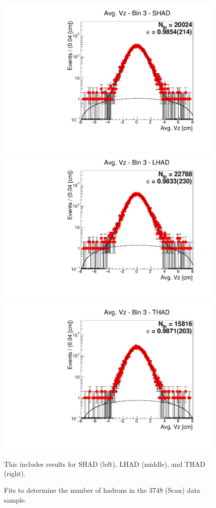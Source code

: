 \begin{figure}[H]
\centering
\includegraphics[scale=0.25]{figures/plots/nonDDbar_fit_results/scan/fit_scan_03_data_SHAD.pdf}
\hspace{-0.5cm}
\includegraphics[scale=0.25]{figures/plots/nonDDbar_fit_results/scan/fit_scan_03_data_LHAD.pdf}
\hspace{-0.5cm}
\includegraphics[scale=0.25]{figures/plots/nonDDbar_fit_results/scan/fit_scan_03_data_THAD.pdf}
\caption{Fits to determine the number of hadrons in the 3748 (Scan) data sample.}
{This includes results for SHAD (left), LHAD (middle), and THAD (right).}
\label{fig:hadron_fits_scan_03}
\end{figure}

